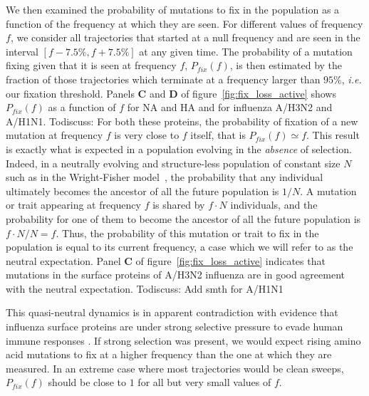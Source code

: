 \documentclass[reprint,amsmath,amssymb,superscriptaddress,showpacs,pre]{revtex4-1}
\newcommand{\discuss}[1]{{\color{green}Todiscuss: #1}}
\begin{document}
We then examined the probability of mutations to fix in the population as a function of the frequency at which they are seen. 
For different values of frequency $f$, we consider all trajectories that started at a null frequency and are seen in the interval $[f - 7.5\%, f + 7.5\%]$ at any given time. 
The probability of a mutation fixing given that it is seen at frequency $f$, $P_{fix}(f)$, is then estimated by the fraction of those trajectories which terminate at a frequency larger than $95\%$, \emph{i.e.} our fixation threshold.
Panels \textbf{C} and \textbf{D} of figure~\ref{fig:fix_loss_active} shows $P_{fix}(f)$ as a function of $f$ for NA and HA and for influenza A/H3N2 and A/H1N1. 
\discuss{For both these proteins, the probability of fixation of a new mutation at frequency $f$ is very close to $f$ itself, that is $P_{fix}(f)\simeq f$.} 
This result is exactly what is expected in a population evolving in the \emph{absence} of selection. 
Indeed, in a neutrally evolving and structure-less population of constant size $N$ such as in the Wright-Fisher model~\cite{kimura_diffusion_1964}, the probability that any individual ultimately becomes the ancestor of all the future population is $1/N$. 
A mutation or trait appearing at frequency $f$ is shared by $f\cdot N$ individuals, and the probability for one of them to become the ancestor of all the future population is $f\cdot N/N=f$. 
Thus, the probability of this mutation or trait to fix in the population is equal to its current frequency, a case which we will refer to as the neutral expectation. 
Panel \textbf{C} of figure~\ref{fig:fix_loss_active} indicates that mutations in the surface proteins of A/H3N2 influenza are in good agreement with the neutral expectation. \discuss{Add smth for A/H1N1}

This quasi-neutral dynamics is in apparent contradiction with evidence that influenza surface proteins are under strong selective pressure to evade human immune responses \citep{bhatt_genomic_2011}.
If strong selection was present, we would expect rising amino acid mutations to fix at a higher frequency than the one at which they are measured. 
In an extreme case where most trajectories would be clean sweeps, $P_{fix}(f)$ should be close to $1$ for all but very small values of $f$.
\end{document}
